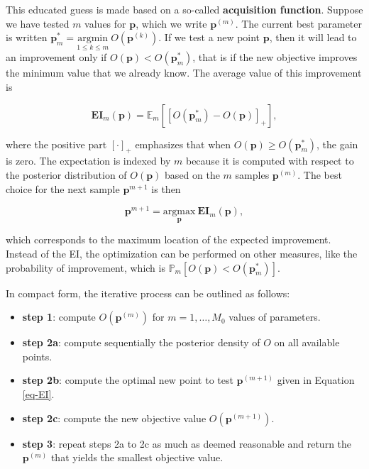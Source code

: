 This educated guess is made based on a so-called \textbf{acquisition function}. Suppose we have tested $m$ values for $\textbf{p}$, which we write $\textbf{p}^{(m)}$. The current best parameter is written $\textbf{p}_m^*=\underset{1\le k\le m}{\text{argmin}} \ O(\textbf{p}^{(k)})$. If we test a new point $\textbf{p}$, then it will lead to an improvement only if $O(\textbf{p})<O(\textbf{p}_m^*)$, that is if the new objective improves the minimum value that we already know. The average value of this improvement is

\begin{equation}
\label{eq-acquisition}
\textbf{EI}_m(\textbf{p})=\mathbb{E}_m[[O(\textbf{p}_m^*)-O(\textbf{p})]_+],
\end{equation}

where the positive part $[\cdot]_+$ emphasizes that when $O(\textbf{p})\ge O(\textbf{p}_m^*)$, the gain is zero. The expectation is indexed by $m$ because it is computed with respect to the posterior distribution of $O(\textbf{p})$ based on the $m$ samples $\textbf{p}^{(m)}$. The best choice for the next sample $\textbf{p}^{m+1}$ is then

\begin{equation}
\label{eq-EI}
\textbf{p}^{m+1}=\underset{\textbf{p}}{\text{argmax}} \ \textbf{EI}_m(\textbf{p}),
\end{equation}

which corresponds to the maximum location of the expected improvement. Instead of the EI, the optimization can be performed on other measures, like the probability of improvement, which is $\mathbb{P}_m[O(\textbf{p})<O(\textbf{p}_m^*)]$.

In compact form, the iterative process can be outlined as follows:

\begin{itemize}
\item \textbf{step 1}: compute $O(\textbf{p}^{(m)})$ for $m=1,\dots,M_0$ values of parameters.
\item \textbf{step 2a}: compute sequentially the posterior density of $O$ on all available points.
\item \textbf{step 2b}: compute the optimal new point to test $\textbf{p}^{(m+1)}$ given in Equation \ref{eq-EI}.
\item \textbf{step 2c}: compute the new objective value $O(\textbf{p}^{(m+1)})$.
\item \textbf{step 3}: repeat steps 2a to 2c as much as deemed reasonable and return the $\textbf{p}^{(m)}$ that yields the smallest objective value.
\end{itemize}

